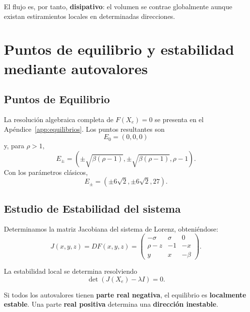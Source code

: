 \documentclass[12pt,a4paper,oneside]{report}
\numberwithin{equation}{chapter}
\begin{document}
El flujo es, por tanto, \textbf{disipativo}: el volumen se contrae globalmente aunque existan estiramientos locales en determinadas direcciones.

\chapter{Puntos de equilibrio y estabilidad mediante autovalores}

\section{Puntos de Equilibrio}
La resolución algebraica completa de \(F(X_e)=0\) se presenta en el Apéndice~\ref{app:equilibrios}. Los puntos resultantes son
\begin{equation}
    E_0=(0,0,0)
\end{equation}
y, para \(\rho>1\),
\begin{equation}
    E_{\pm}= \left( \pm\sqrt{\beta(\rho-1)}, \pm\sqrt{\beta(\rho-1)}, \rho-1 \right).
\end{equation}
Con los parámetros clásicos,
\begin{equation}
    \boxed{ E_{\pm}=(\pm6\sqrt2,\pm6\sqrt2,27). }
\end{equation}

\section{Estudio de Estabilidad del sistema}
Determinamos la matriz Jacobiana del sistema de Lorenz, obteniéndose: 
\begin{equation}
    \boxed{
    J(x,y,z)=DF(x,y,z)=
    \begin{pmatrix}
        -\sigma & \sigma & 0\\
        \rho-z & -1 & -x\\
        y & x & -\beta
    \end{pmatrix}.}
    \label{eq:jacobiana}
\end{equation}

La estabilidad local se determina resolviendo
\begin{equation}
    \boxed{\det\!\left(J(X_e)-\lambda I\right)=0.}
    \label{eq:problema-espectral}
\end{equation}

Si todos los autovalores tienen \textbf{parte real negativa}, el equilibrio es \textbf{localmente estable}. Una parte \textbf{real positiva} determina una \textbf{dirección inestable}.
\end{document}
